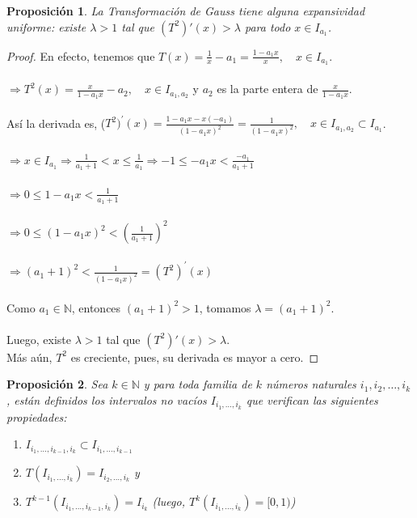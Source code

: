 \documentclass[12pt]{report}
\newtheorem{prop}{Proposición}[section]
\begin{document}
\begin{prop}
La Transformación de Gauss tiene alguna expansividad uniforme: existe $\lambda>1$ tal que $(T^2)'(x)>\lambda$ para todo $x\in I_{a_{1}}$.
\end{prop}
\begin{proof}
En efecto, tenemos que $T(x)=\frac{1}{x} - a_{1}=\frac{1-a_{1}x}{x},\quad x\in I_{a_{1}}$.
\\
\\
$\Rightarrow T^{2}(x)=\frac{x}{1-a_{1}x}-a_{2},\quad x\in I_{a_{1},a_{2}}$ y $a_{2}$ es la parte entera de $\frac{x}{1-a_{1}x}$.
\\
\\
Así la derivada es, ($T^{2})^{\prime}(x)=\frac{1-a_{1}x-x(-a_{1})}{(1-a_{1}x)^2}=\frac{1}{(1-a_{1}x)^{2}},\quad x\in I_{a_{1},a_{2}}\subset I_{a_{1}}$.
\\
\\
$\Rightarrow x\in I_{a_{1}} \Rightarrow\frac{1}{a_{1}+1} <  x \leq \frac{1}{a_{1}} \Rightarrow -1 \leq -a_{1}x < \frac{-a_{1}}{a_{1}+1}$\\
\\
$\Rightarrow 0 \leq 1-a_{1}x < \frac{1}{a_{1}+1}$
\\
\\
$\Rightarrow 0 \leq (1-a_{1}x)^{2} < (\frac{1}{a_{1}+1})^{2}$
\\
\\
$\Rightarrow ({a_{1}+1})^{2}< \frac{1}{(1-a_{1}x)^{2}}=(T^{2})^{\prime}(x)$
\\
\\
Como $a_{1}\in\mathbb{N}$, entonces $({a_{1}+1})^{2}>1$, tomamos $\lambda=({a_{1}+1})^{2}$.
\\
\\
Luego, existe $\lambda>1$ tal que $(T^2)'(x)>\lambda$.
\\
Más aún, $T^{2}$ es creciente, pues, su derivada es mayor a cero. 
\end{proof}

\begin{prop}
Sea $k\in\mathbb{N}$ y para toda familia de $k$ números naturales $i_{1},i_{2},\ldots,i_{k}$, están definidos los intervalos no vacíos $I_{i_{1},\ldots,i_{k}}$ que verifican las siguientes propiedades:
\begin{enumerate}
    \item $I_{i_{1},\ldots,i_{k-1},i_{k}}\subset I_{i_{1},\ldots,i_{k-1}}$
    \item $T(I_{i_{1},\ldots,i_{k}})=I_{i_{2},\ldots,i_{k}}$ y
    \item $T^{k-1}(I_{i_{1},\ldots,i_{k-1},i_{k}})=I_{i_{k}}$ (luego, $T^{k}(I_{i_{1},\ldots,i_{k}})=[0,1)$)
\end{enumerate}
\label{PropInterval}
\end{prop} 
\end{document}
